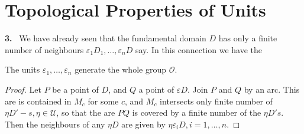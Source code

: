 \section{Topological Properties of Units}\label{chap2:sec5} %

\textbf{3.}~ We have already seen that the fundamental domain $D$ has only a
finite number of neighbours $\varepsilon_1 D_1,  \ldots,  \varepsilon
_n D$ say. In this connection we have the  
 
\setcounter{theorem}{0}
\begin{theorem}\label{chap2:sec5:thm1} %
  The units $\varepsilon_1, \ldots, \varepsilon _n$ generate the
  whole group $\mathscr{O}$.  
\end{theorem}

\begin{proof}
  Let $P$ be a point of $D$, and $Q$ a point of $\varepsilon D$. Join
  $P$ and $Q$ by an arc. This are is contained in $M_c$ for some $c$,
  and $M_c$ intersects only finite number of $\eta D' -s, \eta \in
  \mathscr{U}$, so that the are $PQ$ is covered by a finite number of
  the $\eta D' s$. Then the neighbours of any $\eta D$ are given by
  $\eta \varepsilon _i D, i = 1, \ldots,  n$.  
\end{proof}

